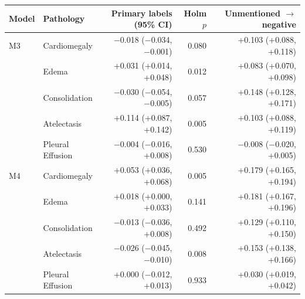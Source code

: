 \begin{tabular}{llrrr}
\toprule
Model & Pathology & Primary labels (95\% CI) & Holm $p$ & Unmentioned $\to$ negative\\
\midrule
M3 & Cardiomegaly & $-$0.018 ($-$0.034, $-$0.001) & 0.080 & +0.103 (+0.088, +0.118)\\
 & Edema & +0.031 (+0.014, +0.048) & 0.012 & +0.083 (+0.070, +0.098)\\
 & Consolidation & $-$0.030 ($-$0.054, $-$0.005) & 0.057 & +0.148 (+0.128, +0.171)\\
 & Atelectasis & +0.114 (+0.087, +0.142) & 0.005 & +0.103 (+0.088, +0.119)\\
 & Pleural Effusion & $-$0.004 ($-$0.016, +0.008) & 0.530 & $-$0.008 ($-$0.020, +0.005)\\
\addlinespace
M4 & Cardiomegaly & +0.053 (+0.036, +0.068) & 0.005 & +0.179 (+0.165, +0.194)\\
 & Edema & +0.018 (+0.000, +0.033) & 0.141 & +0.181 (+0.167, +0.196)\\
 & Consolidation & $-$0.013 ($-$0.036, +0.008) & 0.492 & +0.129 (+0.110, +0.150)\\
 & Atelectasis & $-$0.026 ($-$0.045, $-$0.010) & 0.008 & +0.153 (+0.138, +0.166)\\
 & Pleural Effusion & +0.000 ($-$0.012, +0.013) & 0.933 & +0.030 (+0.019, +0.042)\\
\bottomrule
\end{tabular}
